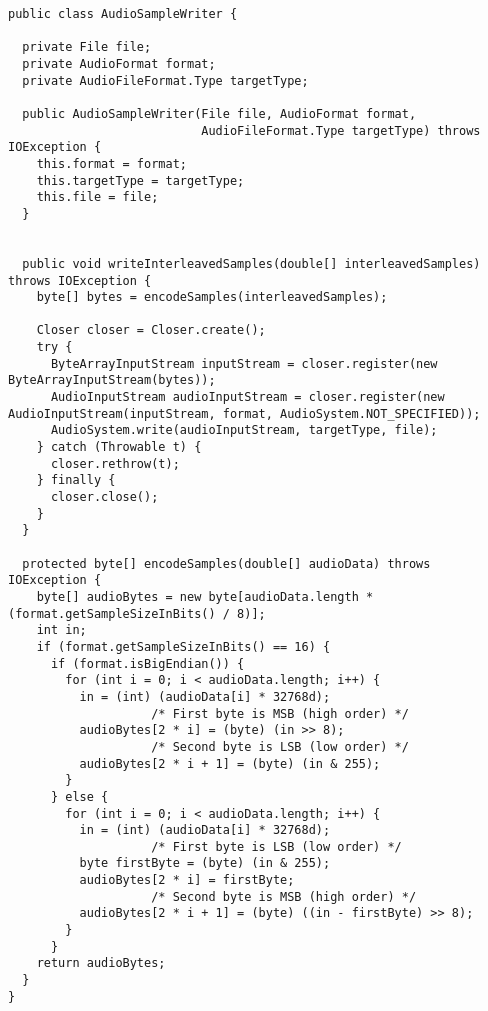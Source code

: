 \begin{lstlisting}[caption={Запись wav файлов}]
public class AudioSampleWriter {

  private File file;
  private AudioFormat format;
  private AudioFileFormat.Type targetType;

  public AudioSampleWriter(File file, AudioFormat format,
                           AudioFileFormat.Type targetType) throws IOException {
    this.format = format;
    this.targetType = targetType;
    this.file = file;
  }


  public void writeInterleavedSamples(double[] interleavedSamples) throws IOException {
    byte[] bytes = encodeSamples(interleavedSamples);

    Closer closer = Closer.create();
    try {
      ByteArrayInputStream inputStream = closer.register(new ByteArrayInputStream(bytes));
      AudioInputStream audioInputStream = closer.register(new AudioInputStream(inputStream, format, AudioSystem.NOT_SPECIFIED));
      AudioSystem.write(audioInputStream, targetType, file);
    } catch (Throwable t) {
      closer.rethrow(t);
    } finally {
      closer.close();
    }
  }

  protected byte[] encodeSamples(double[] audioData) throws IOException {
    byte[] audioBytes = new byte[audioData.length * (format.getSampleSizeInBits() / 8)];
    int in;
    if (format.getSampleSizeInBits() == 16) {
      if (format.isBigEndian()) {
        for (int i = 0; i < audioData.length; i++) {
          in = (int) (audioData[i] * 32768d);
                    /* First byte is MSB (high order) */
          audioBytes[2 * i] = (byte) (in >> 8);
                    /* Second byte is LSB (low order) */
          audioBytes[2 * i + 1] = (byte) (in & 255);
        }
      } else {
        for (int i = 0; i < audioData.length; i++) {
          in = (int) (audioData[i] * 32768d);
                    /* First byte is LSB (low order) */
          byte firstByte = (byte) (in & 255);
          audioBytes[2 * i] = firstByte;
                    /* Second byte is MSB (high order) */
          audioBytes[2 * i + 1] = (byte) ((in - firstByte) >> 8);
        }
      }
    return audioBytes;
  }
}
\end{lstlisting}

